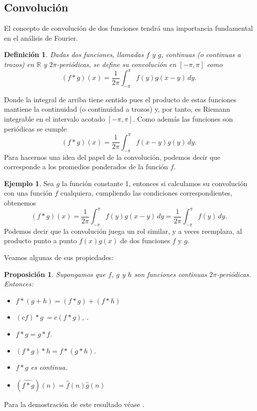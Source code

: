 \documentclass[12pt]{article}
\newcommand{\R}{\mathbb{R}}
\theoremstyle{plain}
\newtheorem{proposicion}[teorema]{Proposición}
\newtheorem{definicion}[teorema]{\textbf{Definición}}
\theoremstyle{definition}
\newtheorem{ejemplo}[teorema]{Ejemplo}
\numberwithin{equation}{section}
\begin{document}
    \subsection{Convolución}
        El concepto de convolución de dos funciones tendrá una importancia fundamental en el análisis de Fourier.
        \begin{definicion}
            Dadas dos funciones, llamadas $f$ y $g$, continuas (o continuas a trozos) en \(\R\) y \(2\pi\)-periódicas, se define su convolución en \([-\pi,\pi]\) como
            $$(f\ast g)(x) = \frac{1}{2\pi} \int_{-\pi}^{\pi} f(y)g(x-y) \,dy .$$
        \end{definicion}
        Donde la integral de arriba tiene sentido pues el producto de estas funciones mantiene la continuidad (o continuidad a trozos) y, por tanto, es Riemann integrable en el intervalo acotado \([-\pi,\pi]\). Como además las funciones son periódicas se cumple
        $$(f\ast g)(x) = \frac{1}{2\pi} \int_{-\pi}^{\pi} f(x-y)g(y) \,dy .$$
        Para hacernos una idea del papel de la convolución, podemos decir que corresponde a los promedios ponderados de la función \(f\).
        \begin{ejemplo}
            Sea \(g\) la función constante 1, entonces si calculamos su convolución con una función \(f\) cualquiera, cumpliendo las condiciones correspondientes, obtenemos
            $$(f\ast g)(x) = \frac{1}{2\pi} \int_{-\pi}^{\pi} f(y)g(x-y) \,dy = \frac{1}{2\pi} \int_{-\pi}^{\pi} f(y) \,dy.$$
        Podemos decir que la convolución juega un rol similar, y a veces reemplaza, al producto punto a punto \(f(x)g(x)\) de dos funciones \(f\) y \(g\).
        \end{ejemplo}
        Veamos algunas de sus propiedades:
        \begin{proposicion}
            \label{propconv}
            Supongamos que \(f\), \(g\) y \(h\) son funciones continuas \(2\pi\)-periódicas. Entonces:
            \begin{itemize}
                \item[(i)] \(f \ast (g+h) = (f \ast g) + (f \ast h)\)
                \item[(ii)]  \((cf) \ast g\ = c(f \ast g)\), .
                \item [(iii)]  \(f \ast g = g \ast f\).
                \item [(iv)]  \((f \ast g) \ast h = f \ast (g \ast h)\).
                \item [(v)]  \(f \ast g\) es continua.
                \item [(vi)] \((\widehat{f \ast g})  (n)  = \hat{f}(n)\hat{g}(n)\)
            \end{itemize}
        \end{proposicion}
        Para la demostración de este resultado véase \cite[Chapter 3. Proposición 3.1]{stein_fourier}.
\end{document}
